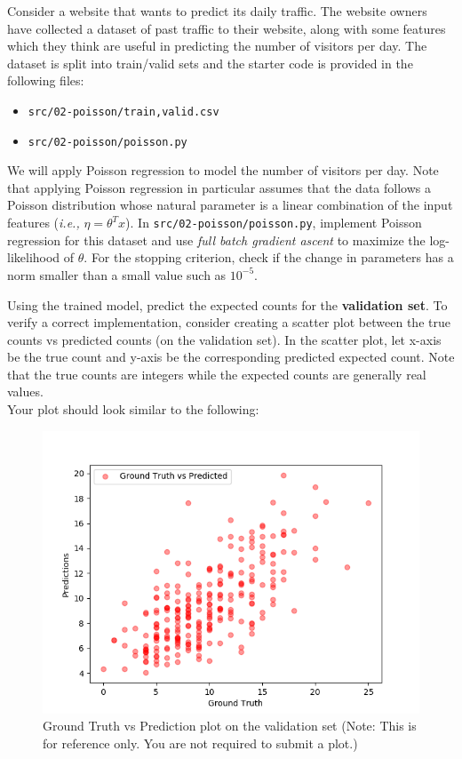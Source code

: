 \item {}

Consider a website that wants to predict its daily traffic. The website owners have collected a dataset of past traffic to their website, along with some features which they think are useful in
predicting the number of visitors per day. The dataset is split into train/valid sets and the starter code is provided in the following files:
\begin{center}
    \begin{itemize}
        \item 	\texttt{src/02-poisson/{train,valid}.csv}
        \item   \texttt{src/02-poisson/poisson.py}
    \end{itemize}
\end{center}
We will apply Poisson regression to model the number of visitors per day. Note that applying Poisson regression in particular assumes that the data follows a Poisson distribution whose natural parameter is a linear combination of the input features (\emph{i.e.,} $\eta = \theta^T x$). In \texttt{src/02-poisson/poisson.py}, implement Poisson regression for this dataset and use \emph{full batch gradient ascent} to maximize the log-likelihood of $\theta$. For the stopping criterion, check if the change in parameters has a norm smaller than a small value such as $10^{-5}$.

Using the trained model, predict the expected counts for the \textbf{validation set}.  To verify a correct implementation, consider creating a scatter plot between the true counts vs predicted counts (on the validation set). In the scatter plot, let x-axis be the true count and y-axis be the corresponding predicted expected count. Note that the true counts are integers while the expected counts are generally real values.\\

Your plot should look similar to the following:

\begin{figure}[H]
	\centering
	\vspace{-2mm}
	\includegraphics[width=0.65\linewidth]{02-poisson/poisson_val.png}
	\caption{Ground Truth vs Prediction plot on the validation set (Note: This is for reference only.  You are not required to submit a plot.)}
\end{figure}

